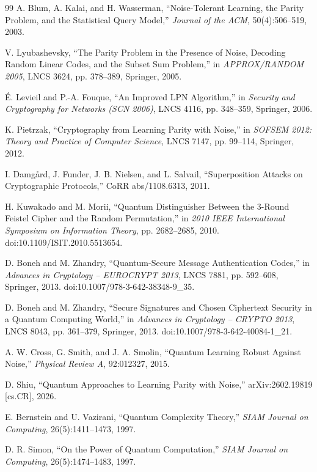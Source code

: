 \documentclass[10pt,twocolumn]{article}
\theoremstyle{definition}
\begin{document}
\begin{thebibliography}{99}
 A. Blum, A. Kalai, and H. Wasserman, ``Noise-Tolerant Learning, the Parity Problem, and the Statistical Query Model,'' \emph{Journal of the ACM}, 50(4):506--519, 2003.

 V. Lyubashevsky, ``The Parity Problem in the Presence of Noise, Decoding Random Linear Codes, and the Subset Sum Problem,'' in \emph{APPROX/RANDOM 2005}, LNCS 3624, pp. 378--389, Springer, 2005.

 \'E. Levieil and P.-A. Fouque, ``An Improved LPN Algorithm,'' in \emph{Security and Cryptography for Networks (SCN 2006)}, LNCS 4116, pp. 348--359, Springer, 2006.

 K. Pietrzak, ``Cryptography from Learning Parity with Noise,'' in \emph{SOFSEM 2012: Theory and Practice of Computer Science}, LNCS 7147, pp. 99--114, Springer, 2012.

 I. Damg\aa rd, J. Funder, J. B. Nielsen, and L. Salvail, ``Superposition Attacks on Cryptographic Protocols,'' CoRR abs/1108.6313, 2011.

 H. Kuwakado and M. Morii, ``Quantum Distinguisher Between the 3-Round Feistel Cipher and the Random Permutation,'' in \emph{2010 IEEE International Symposium on Information Theory}, pp. 2682--2685, 2010. doi:10.1109/ISIT.2010.5513654.

 D. Boneh and M. Zhandry, ``Quantum-Secure Message Authentication Codes,'' in \emph{Advances in Cryptology -- EUROCRYPT 2013}, LNCS 7881, pp. 592--608, Springer, 2013. doi:10.1007/978-3-642-38348-9\_35.

 D. Boneh and M. Zhandry, ``Secure Signatures and Chosen Ciphertext Security in a Quantum Computing World,'' in \emph{Advances in Cryptology -- CRYPTO 2013}, LNCS 8043, pp. 361--379, Springer, 2013. doi:10.1007/978-3-642-40084-1\_21.

 A. W. Cross, G. Smith, and J. A. Smolin, ``Quantum Learning Robust Against Noise,'' \emph{Physical Review A}, 92:012327, 2015.

 D. Shiu, ``Quantum Approaches to Learning Parity with Noise,'' arXiv:2602.19819 [cs.CR], 2026.

 E. Bernstein and U. Vazirani, ``Quantum Complexity Theory,'' \emph{SIAM Journal on Computing}, 26(5):1411--1473, 1997.

 D. R. Simon, ``On the Power of Quantum Computation,'' \emph{SIAM Journal on Computing}, 26(5):1474--1483, 1997.


\end{thebibliography}
\end{document}
